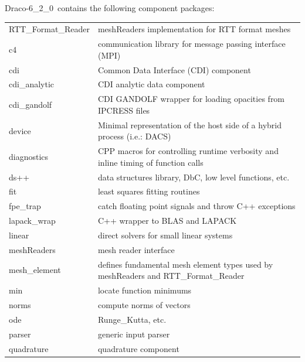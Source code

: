 \documentclass[note]{ResearchNote_pdf}
\newcommand{\draco}{Draco}
\newcommand{\dracor}{\draco-6\_2\_0}
\newcommand{\tableText}[1]{{\raggedright #1}}
\begin{document}
\dracor\ contains the following component packages:
\begin{center}
  \footnotesize
  \begin{tabular}{lp{4.0in}}
    \hline\hline
    \textsf{RTT\_Format\_Reader} & \tableText{\textsf{meshReaders}
      implementation for RTT format meshes} \\
    \textsf{c4} & \tableText{communication library for message passing interface (MPI)} \\
    \textsf{cdi} & \tableText{Common Data Interface (CDI) component} \\
    \textsf{cdi\_analytic} & \tableText{CDI analytic data component} \\
    \textsf{cdi\_gandolf} & \tableText{CDI GANDOLF wrapper for loading
      opacities from IPCRESS files~\cite{gandolf,tops}} \\
    \textsf{device}         & \tableText{Minimal representation of the
      host side of a hybrid process (i.e.: DACS)} \\
    \textsf{diagnostics}  & \tableText{CPP macros for controlling runtime
      verbosity and inline timing of function calls} \\
    \textsf{ds++}         & \tableText{data structures library, DbC,
      low level functions, etc.} \\
    \textsf{fit}          & \tableText{least squares fitting routines} \\
    \textsf{fpe\_trap}    & \tableText{catch floating point signals and throw
      C++ exceptions} \\
    \textsf{lapack\_wrap} & \tableText{C++ wrapper to BLAS and LAPACK} \\
    \textsf{linear}       & \tableText{direct solvers for small linear systems} \\
    \textsf{meshReaders}  & \tableText{mesh reader interface} \\
    \textsf{mesh\_element} & \tableText{defines fundamental mesh element types
      used by \textsf{meshReaders} and \textsf{RTT\_Format\_Reader}} \\
    \textsf{min}          & \tableText{locate function minimums} \\
    \textsf{norms}        & \tableText{compute norms of vectors} \\
    \textsf{ode}          & \tableText{Runge\_Kutta, etc.} \\
    \textsf{parser}       & \tableText{generic input parser} \\
    \textsf{quadrature}   & \tableText{quadrature component} \\

\end{tabular}
\end{center}
\end{document}
